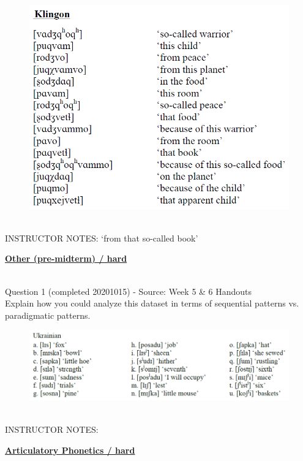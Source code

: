 \documentclass[12pt]{article}
\begin{document}
\begin{figure}[H]
\includegraphics{../images/klingon.png}
\end{figure}

~\\
INSTRUCTOR NOTES: ‘from that so-called book’


\newpage\textbf{\underline{\huge Other (pre-midterm) / hard\\}}

~\\

{\large Question 1} (completed 20201015) - Source: Week 5 \& 6 Handouts\\

Explain how you could analyze this dataset in terms of sequential patterns vs. paradigmatic patterns.\\

\begin{figure}[H]
\includegraphics{../images/ukrainian.png}
\end{figure}

~\\
INSTRUCTOR NOTES: 


\newpage\textbf{\underline{\huge Articulatory Phonetics / hard\\}}
\end{document}
